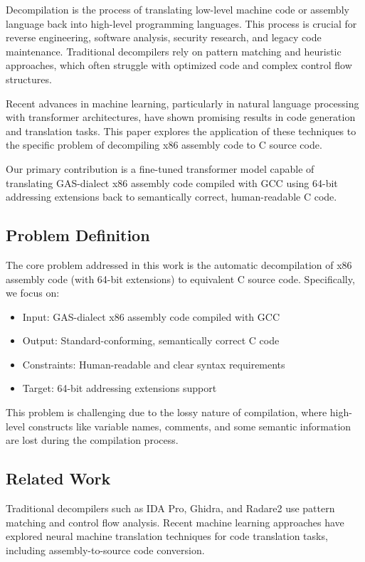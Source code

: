 \documentclass[../main.tex]{subfiles}
\begin{document}
Decompilation is the process of translating low-level machine code or assembly language back into high-level programming languages. This process is crucial for reverse engineering, software analysis, security research, and legacy code maintenance. Traditional decompilers rely on pattern matching and heuristic approaches, which often struggle with optimized code and complex control flow structures.

Recent advances in machine learning, particularly in natural language processing with transformer architectures, have shown promising results in code generation and translation tasks. This paper explores the application of these techniques to the specific problem of decompiling x86 assembly code to C source code.

Our primary contribution is a fine-tuned transformer model capable of translating GAS-dialect x86 assembly code compiled with GCC using 64-bit addressing extensions back to semantically correct, human-readable C code.

\subsection{Problem Definition}

The core problem addressed in this work is the automatic decompilation of x86 assembly code (with 64-bit extensions) to equivalent C source code. Specifically, we focus on:

\begin{itemize}
\item Input: GAS-dialect x86 assembly code compiled with GCC
\item Output: Standard-conforming, semantically correct C code
\item Constraints: Human-readable and clear syntax requirements
\item Target: 64-bit addressing extensions support
\end{itemize}

This problem is challenging due to the lossy nature of compilation, where high-level constructs like variable names, comments, and some semantic information are lost during the compilation process.

\subsection{Related Work}

Traditional decompilers such as IDA Pro, Ghidra, and Radare2 use pattern matching and control flow analysis. Recent machine learning approaches have explored neural machine translation techniques for code translation tasks, including assembly-to-source code conversion.
\end{document}
